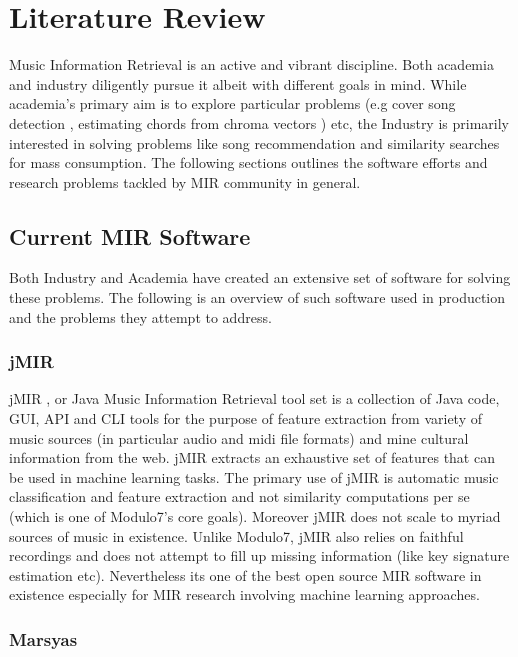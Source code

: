 \chapter{Literature Review}

\noindent Music Information Retrieval is an active and vibrant discipline. Both academia and industry diligently pursue it albeit with different goals in mind. While academia's primary aim is to explore particular problems (e.g cover song detection \cite{coversongid}, estimating chords from chroma vectors \cite{chord-detection} ) etc, the Industry is primarily interested in solving problems like song recommendation and similarity searches for mass consumption. The following sections outlines the software efforts and research problems tackled by MIR community in general. 

\section{Current MIR Software}
\noindent Both Industry and Academia have created an extensive set of software for solving these problems. The following is an overview of such software used in production and the problems they attempt to address.

\subsection{jMIR}

\noindent jMIR  \cite{jMIR}, or Java Music Information Retrieval tool set is a collection of Java code, GUI, API and CLI tools for the purpose of feature extraction from variety of music sources (in particular audio and midi file formats) and mine cultural information from the web. jMIR extracts an exhaustive set of features that can be used in machine learning tasks. The primary use of jMIR is automatic music classification and feature extraction and not similarity computations per se (which is one of Modulo7's core goals). Moreover jMIR does not scale to myriad sources of music in existence. Unlike Modulo7, jMIR also relies on faithful recordings and does not attempt to fill up missing information (like key signature estimation etc). Nevertheless its one of the best open source MIR software in existence especially for MIR research involving machine learning approaches. 

\subsection{Marsyas}

